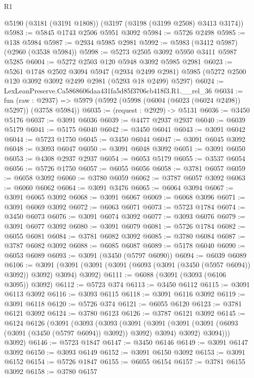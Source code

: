 \begin{lexlean}{R1}
\begin{coremodule}
    @5190
    (@3181 (@3191 @1808))
    (@3197 (@3198 (@3199 @2508) @3413 @3174))
@5983 := @5845 @1743 @2506 @5951 @3092
@5984 := @5726 @2498
@5985 := @138 @5984
@5987 := @2934 @5985 @2981
@5992 := @5983 (@3412 @5987) (@2960 (@3538 @5984))
@5998 := @5273 @2505 @3092 @5950 @3411 @5987 @5285
@6004 := @5272 @2503 @120 @5948 @3092 @5985 @2981
@6023 := @5261
    @1748
    @2502
    @3094
    @5947
    (@2934 @2499 @2981)
    @5985
    (@5272 @2500 @120 @3092 @3092 @2499 @2981 (@5293 @18 @2499) @5297)
@6024 := LexLeanPreserve.Ca5868606daa431fa5d85f3706cb418f3.R1.__rel_36
@6034 := fun (raw : @2937) =>
  @5979 (@5992 (@5998 (@6004 (@6023 (@6024 @2498)) @5297)) (@3758 @5984))
@6035 := (request : @2929) -> @5131
@6036 := @3450 @5176
@6037 := @3091 @6036
@6039 := @4477 @2937 @2937
@6040 := @6039 @5179
@6041 := @5175 @6040
@6042 := @3450 @6041
@6043 := @3091 @6042
@6044 := @5723 @1750
@6045 := @3450 @6044
@6047 := @3091 @6045 @3092
@6048 := @3093 @6047
@6050 := @3091 @6048 @3092
@6051 := @3091 @6050
@6053 := @4308 @2937 @2937
@6054 := @6053 @5179
@6055 := @3537 @6054
@6056 := @5726 @1750
@6057 := @6055 @6056
@6058 := @3781 @6057
@6059 := @6058 @3092
@6060 := @3780 @6059
@6062 := @3787 @6057 @3092
@6063 := @6060 @6062
@6064 := @3091 @3476
@6065 := @6064 @3094
@6067 := @3091 @6065 @3092
@6068 := @3091 @6067
@6069 := @6068 @3096
@6071 := @3091 @6069 @3092
@6072 := @6063 @6071
@6073 := @5723 @1784
@6074 := @3450 @6073
@6076 := @3091 @6074 @3092
@6077 := @3093 @6076
@6079 := @3091 @6077 @3092
@6080 := @3091 @6079
@6081 := @5726 @1784
@6082 := @6055 @6081
@6084 := @3781 @6082 @3092
@6085 := @3780 @6084
@6087 := @3787 @6082 @3092
@6088 := @6085 @6087
@6089 := @5178 @6040
@6090 := @6053 @6089
@6093 := @3091 (@3450 (@5797 @6090))
@6094 := @6039 @6089
@6106 := @3091 (@3091 (@3091 (@3091 (@6093 (@3091 (@3450 (@5957 @6094)) @3092)) @3092) @3094) @3092)
@6111 := @6088 (@3091 (@3093 (@6106 @3095)) @3092)
@6112 := @5723 @374
@6113 := @3450 @6112
@6115 := @3091 @6113 @3092
@6116 := @3093 @6115
@6118 := @3091 @6116 @3092
@6119 := @3091 @6118
@6120 := @5726 @374
@6121 := @6055 @6120
@6123 := @3781 @6121 @3092
@6124 := @3780 @6123
@6126 := @3787 @6121 @3092
@6145 := @6124
    @6126
    (@3091
      (@3093
        (@3093
          (@3091
            (@3091 (@3091 (@3091 (@6093 (@3091 (@3450 (@5797 @6094)) @3092)) @3092) @3094) @3092)
            @3094)))
      @3092)
@6146 := @5723 @1847
@6147 := @3450 @6146
@6149 := @3091 @6147 @3092
@6150 := @3093 @6149
@6152 := @3091 @6150 @3092
@6153 := @3091 @6152
@6154 := @5726 @1847
@6155 := @6055 @6154
@6157 := @3781 @6155 @3092
@6158 := @3780 @6157

\end{coremodule}
\end{lexlean}

